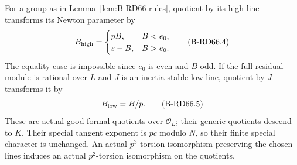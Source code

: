 \begin{lemma}
\label{lem:B-RD66-quotients}
For a group as in Lemma~\ref{lem:B-RD66-rules}, quotient by its
high line transforms its Newton parameter by
\[
 B_{\rm high}=\begin{cases}pB,&B<e_0,\\s-B,&B>e_0.\end{cases}
                                                        \tag{B-RD66.4}
\]
The equality case is impossible since $e_0$ is even and $B$ odd.
If the full residual module is rational over $L$ and $J$ is an
inertia-stable low line, quotient by $J$ transforms it by
\[
                         B_{\rm low}=B/p.             \tag{B-RD66.5}
\]
These are actual good formal quotients over $\mathcal O_L$;
their generic quotients descend to $K$. Their special tangent
exponent is $pc$ modulo $N$, so their finite special character
is unchanged. An actual $p^3$-torsion isomorphism preserving the
chosen lines induces an actual $p^2$-torsion isomorphism on the
quotients.
\end{lemma}
